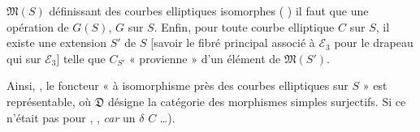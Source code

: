 \documentclass[11pt,a4paper]{article}
\begin{document}
$\mathfrak{M}(S)$ définissant des courbes elliptiques isomorphes (\ill{}
\ill{}) il faut que \struck{\ill{}}  une opération de
$G(S)$, \ill{} $G$ \ill{} \ill{} \ill{} sur $S$. Enfin, pour \struck{\ill{}}
toute courbe elliptique $C$ sur $S$, il existe une extension 
 $S'$ de $S$ [savoir le fibré
principal associé à $\mathcal{E}_3$ pour le drapeau qui \ill{} \ill{} sur
$\mathcal{E}_3$] telle que $C_{S'}$ « provienne » d'un élément de
$\mathfrak{M}(S')$.

Ainsi, \ill{} \ill{} \ill{} \ill{}, le foncteur « \ill{}  à isomorphisme
près des courbes elliptiques sur $S$ » est \struck{\ill{}}
représentable, où $\mathfrak{D}$ désigne la catégorie des
morphismes simples surjectifs.
Si ce n'était pas pour \ill{} , \ill{} \ill{} \ill{}
\ill{} \ill{} \ill{} \ill{} \ill{}, \emph{car} \ill{} \ill{} \ill{} un
 \ill{} \ill{} \ill{} \ill{} \ill{} \ill{} \ill{}
\ill{} \ill{} \ill{} $\delta$ \ill{} $C$ \ill{} \ill{} \ill{} \ill{} \ill{}
\ill{} \ill{} \ill{} \ill{} \ldots).
\end{document}
